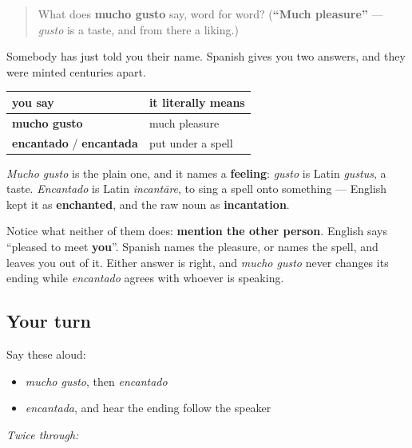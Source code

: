 \label{lesson:ES-C319-dos-respuestas}



\begin{quote}
What does \textbf{mucho gusto} say, word for word? (\textbf{\textquotedblleft{}Much pleasure\textquotedblright{}} — \emph{gusto} is a taste, and from there a liking.)
\end{quote}

\begin{grammarlens}[title={What you've built}]
Somebody has just told you their name. Spanish gives you two answers, and they were minted centuries apart.

\noindent
\begin{tabularx}{\linewidth}{@{}>{\raggedright\arraybackslash}X>{\raggedright\arraybackslash}X@{}}
\toprule
\textbf{you say} & \textbf{it literally means} \\
\midrule
\textbf{mucho gusto} & much pleasure \\
\textbf{encantado} / \textbf{encantada} & put under a spell \\
\bottomrule
\end{tabularx}

\emph{Mucho gusto} is the plain one, and it names a \textbf{feeling}: \emph{gusto} is Latin \emph{gustus}, a taste. \emph{Encantado} is Latin \emph{incantāre}, to sing a spell onto something — English kept it as \textbf{enchanted}, and the raw noun as \textbf{incantation}.

Notice what neither of them does: \textbf{mention the other person}. English says \textquotedblleft{}pleased to meet \textbf{you}\textquotedblright{}. Spanish names the pleasure, or names the spell, and leaves you out of it. Either answer is right, and \emph{mucho gusto} never changes its ending while \emph{encantado} agrees with whoever is speaking.
\end{grammarlens}

\subsection*{Your turn}
Say these aloud:

\begin{itemize}
\raggedright
  \item \emph{mucho gusto}, then \emph{encantado}
  \item \emph{encantada}, and hear the ending follow the speaker
\end{itemize}

\emph{Twice through:}

